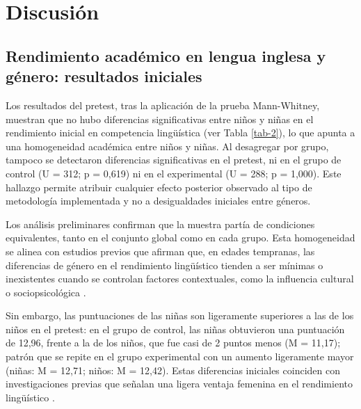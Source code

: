 \documentclass[spanish]{textolivre}
\begin{document}
\section{Discusión}

\subsection{Rendimiento académico en lengua inglesa y género: resultados iniciales}
Los resultados del pretest, tras la aplicación de la prueba Mann-Whitney, muestran que no hubo diferencias significativas entre niños y niñas en el rendimiento inicial en competencia lingüística (ver Tabla \ref{tab-2}), lo que apunta a una homogeneidad académica entre niños y niñas. Al desagregar por grupo, tampoco se detectaron diferencias significativas en el pretest, ni en el grupo de control (U = 312; p = 0,619) ni en el experimental (U = 288; p = 1,000). Este hallazgo permite atribuir cualquier efecto posterior observado al tipo de metodología implementada y no a desigualdades iniciales entre géneros.

Los análisis preliminares confirman que la muestra partía de condiciones equivalentes, tanto en el conjunto global como en cada grupo. Esta homogeneidad se alinea con estudios previos que afirman que, en edades tempranas, las diferencias de género en el rendimiento lingüístico tienden a ser mínimas o inexistentes cuando se controlan factores contextuales, como la influencia cultural o sociopsicológica \cite{saville2012}.

Sin embargo, las puntuaciones de las niñas son ligeramente superiores a las de los niños en el pretest: en el grupo de control, las niñas obtuvieron una puntuación de 12,96, frente a la de los niños, que fue casi de 2 puntos menos (M = 11,17); patrón que se repite en el grupo experimental con un aumento ligeramente mayor (niñas: M = 12,71; niños: M = 12,42). Estas diferencias iniciales coinciden con investigaciones previas que señalan una ligera ventaja femenina en el rendimiento lingüístico \cite{barrios2015, glowka2014}.
\end{document}
